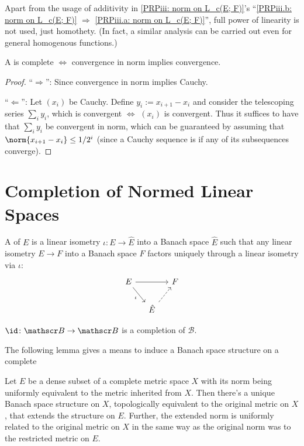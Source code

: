 	\begin{rmk}
		Apart from the usage of additivity in \ref{PRPiii: norm on L_c(E; F)}'s ``\ref{PRPiii.b: norm on L_c(E; F)} $\Rightarrow$ \ref{PRPiii.a: norm on L_c(E; F)}'', full power of linearity is not used, just homothety. (In fact, a similar analysis can be carried out even for general homogenous functions.)
	\end{rmk}
	
	
	\begin{lem}
	A \NLS is complete $\iff$ convergence in norm implies convergence.
	\end{lem}
	
	\begin{proof}
	``$\Rightarrow$'': Since convergence in norm implies Cauchy.
	
	``$\Leftarrow$'': Let $(x_i)$ be Cauchy. Define $y_i := x_{i + 1} - x_i$ and consider the telescoping series $\sum_i y_i$, which is convergent $\iff$ $(x_i)$ is convergent. Thus it suffices to have that $\sum_i y_i$ be convergent in norm, which can be guaranteed by assuming \wlogg that $\norm{x_{i + 1} - x_i}\le 1/2^i$ (since a Cauchy sequence is \cgt if any of its subsequences converge).
	\end{proof}
	
	
	
	
\section{Completion of Normed Linear Spaces}

	A  of $E$ is a linear isometry $\iota\colon E\to\hat E$ into a Banach space $\hat E$ such that any linear isometry $E\to F$ into a Banach space $F$ factors uniquely through a linear isometry via $\iota$:
	\[
	\begin{tikzcd}[column sep=small]
		E\ar[rr]\ar[dr, "\iota"'] & & F\\
		& \hat E\ar[ur, dashed] &
	\end{tikzcd}
	\]
	
	
	\begin{cor}
		$\id\colon\mathscr B\to\mathscr B$ is a completion of $\mathscr B$.
	\end{cor}
	
	
	The following lemma gives a means to induce a Banach space structure on a complete 
	
	\begin{lem}\label{LEM: endowing a Banach space structure on a complete metr sp given an NLS structure on a dense subset}
		Let $E$ be a dense subset of a complete metric space $X$ with its norm being uniformly equivalent to the metric inherited from $X$. Then there's a unique Banach space structure on $X$, topologically equivalent to the original metric on $X$, that extends the \NLS structure on $E$. Further, the extended norm is uniformly related to the original metric on $X$ in the same way as the original norm was to the restricted metric on $E$.
	\end{lem}
	
